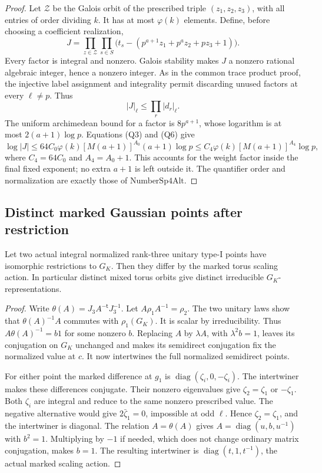 \begin{proof}
Let \(\mathcal Z\) be the Galois orbit of the prescribed
triple \((z_1,z_2,z_3)\), with all entries of order
dividing \(k\).
It has at most \(\varphi(k)\) elements.
Define, before choosing a coefficient realization,
\[
 J=\prod_{z\in\mathcal Z}\prod_{s\in S}
       \bigl(t_s-(p^{a+1}z_1+p^az_2+pz_3+1)\bigr).
 \tag{Q6}
\]
Every factor is integral and nonzero.
Galois stability makes \(J\) a nonzero rational
algebraic integer, hence a nonzero integer.
As in the common trace product proof, the injective label
assignment and integrality permit discarding unused factors
at every \(\ell\ne p\).
Thus
\[
                       |J|_\ell\le\prod_r|d_r|_\ell.
\]
The uniform archimedean bound for a factor is
\(8p^{a+1}\), whose logarithm is at most
\(2(a+1)\log p\).
Equations (Q3) and (Q6) give
\[
 \log|J|\le64C_0\varphi(k)
                    [M(a+1)]^{A_0}(a+1)\log p
           \le C_4\varphi(k)[M(a+1)]^{A_4}\log p,
\]
where \(C_4=64C_0\) and \(A_4=A_0+1\).
This accounts for the weight factor inside the final
fixed exponent; no extra \(a+1\) is left outside it.
The quantifier order and normalization are exactly those
of \(\mathrm{NumberSp4Alt}\).
\end{proof}

\subsection{Distinct marked Gaussian points after restriction}
\label{subsec:sr-gaussian-restriction-classes}
\begin{srlemma}\label{lem:sr-gaussian-marked-restriction-injective}
Let two actual integral normalized rank-three unitary
type-I points have isomorphic restrictions to \(G_K\).
Then they differ by the marked torus scaling action.
In particular distinct mixed torus orbits give distinct
irreducible \(G_K\)-representations.
\end{srlemma}
\begin{proof}
Write \(\theta(A)=J_3A^{-\mathsf t}J_3^{-1}\).
Let \(A\rho_1A^{-1}=\rho_2\).
The two unitary laws show that
\(\theta(A)^{-1}A\) commutes with \(\rho_1(G_K)\).
It is scalar by irreducibility.
Thus \(A\theta(A)^{-1}=b1\) for some nonzero \(b\).
Replacing \(A\) by \(\lambda A\), with
\(\lambda^2b=1\), leaves its conjugation on \(G_K\)
unchanged and makes its semidirect conjugation fix
the normalized value at \(c\).
It now intertwines the full normalized semidirect points.

For either point the marked difference at \(g_1\) is
\(\operatorname{diag}(\zeta_i,0,-\zeta_i)\).
The intertwiner makes these differences conjugate.
Their nonzero eigenvalues give
\(\zeta_2=\zeta_1\) or \(-\zeta_1\).
Both \(\zeta_i\) are integral and reduce to the same
nonzero prescribed value.
The negative alternative would give \(2\bar\zeta_1=0\),
impossible at odd \(\ell\).
Hence \(\zeta_2=\zeta_1\), and the intertwiner is diagonal.
The relation \(A=\theta(A)\) gives
\(A=\operatorname{diag}(u,b,u^{-1})\) with \(b^2=1\).
Multiplying by \(-1\) if needed, which does not change
ordinary matrix conjugation, makes \(b=1\).
The resulting intertwiner is
\(\operatorname{diag}(t,1,t^{-1})\), the actual marked
scaling action.
\end{proof}

